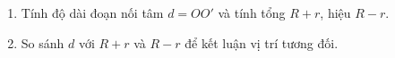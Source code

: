 \begin{enumerate}
\item Tính độ dài đoạn nối tâm $d = OO'$ và tính tổng $R + r$, hiệu $R - r$.
\item So sánh $d$ với $R + r$ và $R - r$ để kết luận vị trí tương đối.
\end{enumerate}

